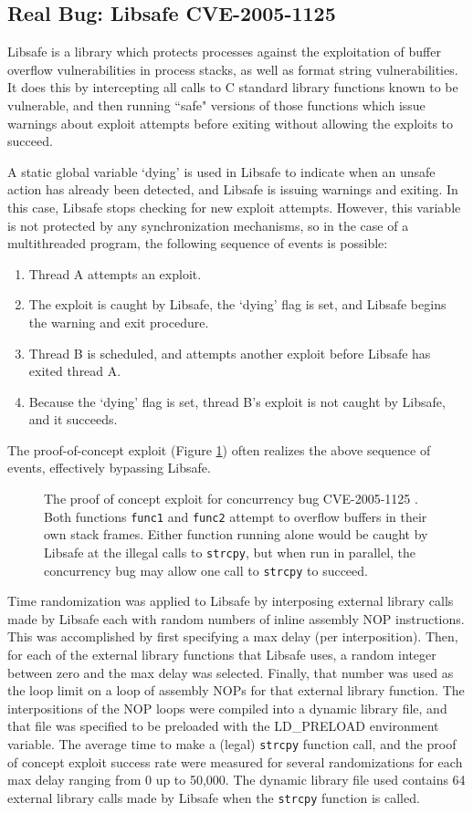 \documentclass[letterpaper,twocolumn,10pt]{article}
\begin{document}
\subsection{Real Bug: Libsafe CVE-2005-1125}
Libsafe is a library which protects processes against the exploitation of buffer overflow vulnerabilities in process stacks, as well as format string vulnerabilities.  It does this by intercepting all calls to C standard library functions known to be vulnerable, and then running ``safe" versions of those functions which issue warnings about exploit attempts before exiting without allowing the exploits to succeed.

A static global variable `dying' is used in Libsafe to indicate when an unsafe action has already been detected, and Libsafe is issuing warnings and exiting.  In this case, Libsafe stops checking for new exploit attempts.  However, this variable is not protected by any synchronization mechanisms, so in the case of a multithreaded program, the following sequence of events is possible:
\begin{enumerate}
	\item Thread A attempts an exploit.
	\item The exploit is caught by Libsafe, the `dying' flag is set, and Libsafe begins the warning and exit procedure.
	\item Thread B is scheduled, and attempts another exploit before Libsafe has exited thread A.
	\item Because the `dying' flag is set, thread B's exploit is not caught by Libsafe, and it succeeds.
\end{enumerate}
The proof-of-concept exploit (Figure \ref{fig_poc}) often realizes the above sequence of events, effectively bypassing Libsafe.
\begin{figure}

\caption{The proof of concept exploit for concurrency bug CVE-2005-1125 \cite{CVE2005-1125}.  Both functions \texttt{func1} and \texttt{func2} attempt to overflow buffers in their own stack frames.  Either function running alone would be caught by Libsafe at the illegal calls to \texttt{strcpy}, but when run in parallel, the concurrency bug may allow one call to \texttt{strcpy} to succeed.}
\label{fig_poc}
\end{figure}
Time randomization was applied to Libsafe by interposing external library calls \cite{Conrad2009} made by Libsafe each with random numbers of inline assembly NOP instructions.  This was accomplished by first specifying a max delay (per interposition).  Then, for each of the external library functions that Libsafe uses, a random integer between zero and the max delay was selected.  Finally, that number was used as the loop limit on a loop of assembly NOPs for that external library function.  The interpositions of the NOP loops were compiled into a dynamic library file, and that file was specified to be preloaded with the LD\_PRELOAD environment variable.
The average time to make a (legal) \texttt{strcpy} function call, and the proof of concept exploit success rate were measured for several randomizations for each max delay ranging from 0 up to 50,000.  The dynamic library file used contains 64 external library calls made by Libsafe when the \texttt{strcpy} function is called.
\end{document}
